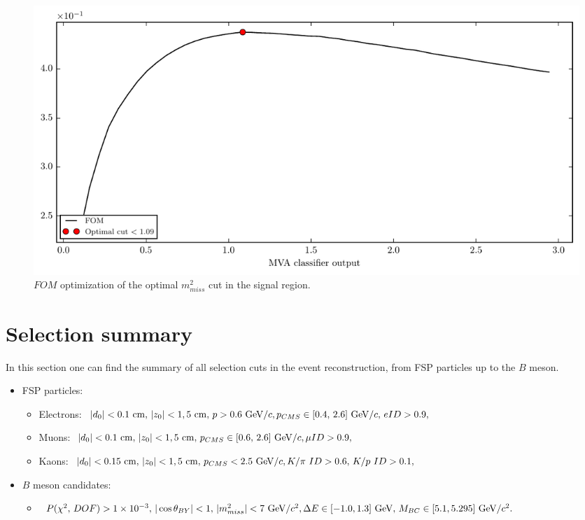 \documentclass[oneside,a4paper,openany,12pt]{scrbook}
\newcommand {\e}[1]{\mathrm{~#1}}
\begin{document}
\begin{figure}[H]
\centering
\captionsetup{width=0.8\linewidth}
\includegraphics[width=\linewidth]{fig/missm2_opt}
\caption{$FOM$ optimization of the optimal $m_{miss}^2$ cut in the signal region.}
\label{fig:missm2opt}
\end{figure}

\section{Selection summary}
\label{s:ss}
In this section one can find the summary of all selection cuts in the event reconstruction, from FSP particles up to the $B$ meson.

\begin{itemize}
\item FSP particles:
	\begin{itemize}
	\item Electrons: $\vert d_0 \vert < 0.1\e{cm},\,\vert z_0 \vert < 1,5\e{cm},\,p>0.6\e{GeV}/c,\\p_{CMS}\in[0.4,\,2.6]\e{GeV}/c,\,eID>0.9,$
    \item Muons: $\vert d_0 \vert < 0.1\e{cm},\,\vert z_0 \vert < 1,5\e{cm},\,p_{CMS}\in[0.6,\,2.6]\e{GeV}/c,\\\mu ID>0.9,$
    \item Kaons: $\vert d_0 \vert < 0.15\e{cm},\,\vert z_0 \vert < 1,5\e{cm},\,p_{CMS} < 2.5\e{GeV}/c,\\K/\pi~ID>0.6,\,K/p~ID>0.1,$
	\end{itemize}
\item $B$ meson candidates:
	\begin{itemize}
	\item $P(\chi^2,\,DOF) > 1\times10^{-3},\,\vert \cos \theta_{BY} \vert < 1,\,\vert m_{miss}^2 \vert < 7\e{GeV}/c^2,\\\Delta E \in [-1.0,1.3]\e{GeV},\,M_{BC} \in [5.1,5.295]\e{GeV}/c^2.$
	\end{itemize}
\end{itemize}
\end{document}

